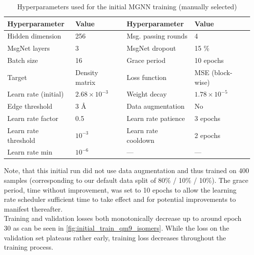 \begin{table}[H]
    \centering
    \caption{Hyperparameters used for the initial MGNN training (manually selected)}
    \label{tab:init_hparams}
    \begin{tabular}{ll ll}
        \toprule
        \textbf{Hyperparameter} & \textbf{Value} & \textbf{Hyperparameter} & \textbf{Value} \\
        \midrule
        Hidden dimension & 256 & Msg. passing rounds & 4 \\
        MsgNet layers & 3 & MsgNet dropout & 15 \% \\
        Batch size & 16 & Grace period & 10 epochs \\
        Target & Density matrix & Loss function & MSE (block-wise) \\
        Learn rate (initial) & $2.68 \times 10^{-3}$ & Weight decay & $1.78 \times 10^{-5}$ \\
        Edge threshold & 3 \AA & Data augmentation & No \\
        \midrule
        Learn rate factor & 0.5 & Learn rate patience & 3 epochs \\
        Learn rate threshold & $10^{-3}$ & Learn rate cooldown & 2 epochs \\
        Learn rate min & $10^{-6}$ & — & — \\
        \bottomrule
    \end{tabular}
\end{table}
Note, that this initial run did not use data augmentation and thus trained on 400 samples (corresponding to our default data split of 80\% / 10\% / 10\%). The grace period, time without improvement, was set to 10 epochs to allow the learning rate scheduler sufficient time to take effect and for potential improvements to manifest thereafter.\\
Training and validation losses both monotonically decrease up to around epoch 30 as can be seen in \autoref{fig:initial_train_qm9_isomers}. While the loss on the validation set plateaus rather early, training loss decreases throughout the training process. 

